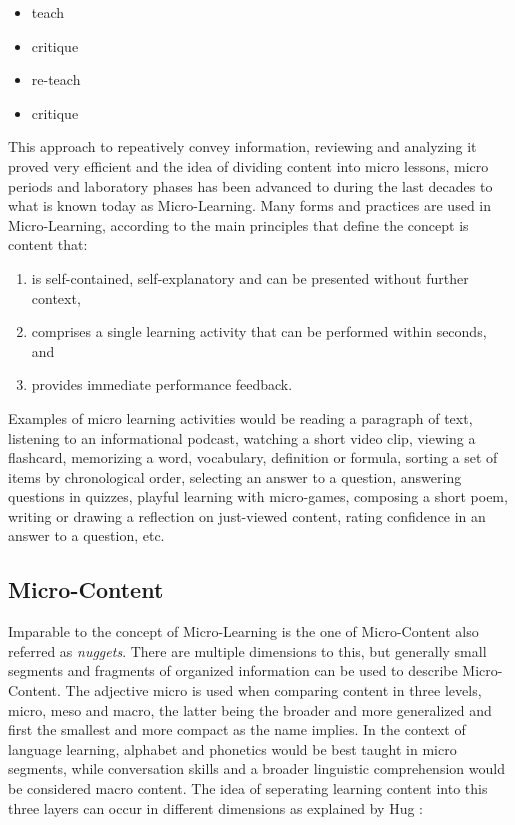\begin{itemize}
    \item teach
    \item critique
    \item re-teach
    \item critique
\end{itemize}

This approach to repeatively convey information, reviewing and analyzing it proved
very efficient and the idea of dividing content into micro lessons, micro periods and
laboratory phases has been advanced to during the last decades to what is known today
as Micro-Learning. 
Many forms and practices are used in Micro-Learning, according to 
\cite{webservicearchitectureforsocialmicrolearning} the main 
principles that define the concept is content that:

\begin{enumerate}
    \item is self-contained, self-explanatory and can be presented without further context,
    \item comprises a single learning activity that can be performed within seconds, and
    \item provides immediate performance feedback.
\end{enumerate}


Examples of micro learning activities would be reading a paragraph of text, 
listening to an informational podcast, watching a short video clip, viewing a 
flashcard, memorizing a word, vocabulary, definition or formula, sorting a set
of items by chronological order, selecting an answer to a question, answering 
questions in quizzes, playful learning with micro-games, composing a short poem,
writing or drawing a reflection on just-viewed content, rating confidence in an 
answer to a question, etc.


\subsection{Micro-Content}

Imparable to the concept of Micro-Learning is the one of Micro-Content also referred as
\textit{nuggets}. There are 
multiple dimensions to this, but generally small segments and fragments of organized
information can be used to describe Micro-Content.
The adjective micro is used when comparing content in three levels, micro, meso and
macro, the latter being the broader and more generalized and first the smallest and 
more compact as the name implies. In the context of language learning, alphabet and
phonetics would be best taught in micro segments, while conversation skills and 
a broader linguistic comprehension would be considered macro content.
The idea of seperating learning content into this three layers can occur in different
dimensions as explained by Hug \cite{microlearningdimensions}:

